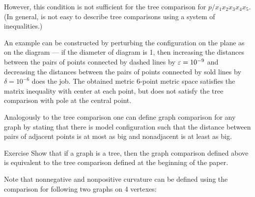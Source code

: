 \begin{wrapfigure}{r}{22 mm}
\vskip-20mm
\end{wrapfigure}

However, this condition is not sufficient for the tree comparison for $p/x_1x_2x_3x_4x_5$.
(In general, is not easy to describe tree comparisons using a system of inequalities.)

An example can be constructed by perturbing the configuration on the plane as on the diagram ---
if the diameter of diagram is 1, 
then increasing the distances between the pairs of points connected by dashed lines by $\varepsilon=10^{-9}$ and decreasing  the distances between the pairs of points connected by sold lines by $\delta=10^{-6}$ does the job.
The obtained metric 6-point metric space satisfies the matrix inequality with center at each point, but does not satisfy the tree comparison with pole at the central point.


Analogously to the tree comparison one can define graph comparison for any graph by stating that there is model configuration such that the distance between pairs of adjacent points is at most as big and nonadjacent is at least as big.

\begin{thm}{Exercise}
Show that if a graph is a tree, then the graph comparison defined above is equivalent to the tree comparison defined at the beginning of the paper.
\end{thm}


Note that nonnegative and nonpositive curvature can be defined using the comparison for following two graphs on 4 vertexes:

